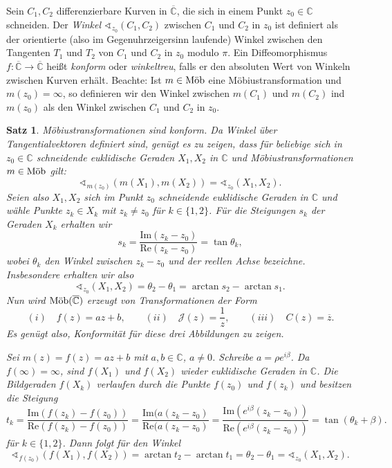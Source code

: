 \documentclass[11pt]{book}
\numberwithin{dummy}{section}
\newtheorem{theorem}{Satz}[section]
\theoremstyle{nonumberbreak}
\newenvironment{pr}[1][]{\ifthenelse{\equal{#1}{}}{\proof}{\proof[#1]}\rm}{\endproof}
\newcommand{\C}{\mathbb{C}}
\newcommand{\CC}{\overline{\mathbb{C}}}
\newcommand{\la}{\longrightarrow}
\newcommand{\amob}{\textup{Möb}}
\begin{document}
\begin{spacing}{1.4}
Sein $C_1, C_2$ differenzierbare Kurven in $\CC$, die sich in einem Punkt $z_0 \in \C$ schneiden. Der \textit{Winkel} $\sphericalangle_{z_0} (C_1, C_2)$ zwischen $C_1$ und $C_2$ in $z_0$ ist definiert als der orientierte (also im Gegenuhrzeigersinn laufende) Winkel zwischen den Tangenten $T_1$ und $T_2$ von $C_1$ und $C_2$ in $z_0$ modulo $\pi$. Ein Diffeomorphismus $f: \CC \la \CC$ heißt \textit{konform} oder \textit{winkeltreu}, falls er den absoluten Wert von Winkeln zwischen Kurven erhält. Beachte: Ist $m \in \amob$ eine Möbiustransformation und $m(z_0) = \infty$, so definieren wir den Winkel zwischen $m(C_1)$ und $m(C_2)$ ind $m(z_0)$ als den Winkel zwischen $C_1$ und $C_2$ in $z_0$.


\hypertarget{satzeinsachteins}{}
\begin{theorem}    %
Möbiustransformationen sind konform.
\begin{pr}
Da Winkel über Tangentialvektoren definiert sind, genügt es zu zeigen, dass für beliebige sich in $z_0 \in \C$ schneidende euklidische Geraden $X_1, X_2$ in $\C$ und Möbiustransformationen $m \in \amob$ gilt:
$$\sphericalangle_{m(z_0)} (m(X_1), m(X_2)) = \sphericalangle_{z_0} (X_1, X_2).$$
Seien also $X_1, X_2$ sich im Punkt $z_0$ schneidende euklidische Geraden in $\C$ und wähle Punkte $z_k \in X_k$ mit $z_k \neq z_0$ für $k \in \{1,2\}$. Für die Steigungen $s_k$ der Geraden $X_k$ erhalten wir 
$$s_k = \frac{ \mathrm{Im}(z_k-z_0)}{\mathrm{Re}(z_k - z_0)} = \tan \theta_k,$$
wobei $\theta_k$ den Winkel zwischen $z_k-z_0$ und der reellen Achse bezeichne. Insbesondere erhalten wir also 
$$\sphericalangle_{z_0}(X_1, X_2) = \theta_2 - \theta_1 = \arctan s_2 - \arctan s_1.$$
Nun wird $\amob(\CC)$ erzeugt von Transformationen der Form 
$$(i) \quad f(z) = az+b, \qquad (ii) \quad \mathcal{J}(z) = \frac{1}{z}, \qquad (iii) \quad C(z) = \overline{z}.$$
Es genügt also, Konformität für diese drei Abbildungen zu zeigen.
\begin{compactenum}
\item Sei $m(z) = f(z) = az+b$ mit $a,b \in \C$, $a \neq 0$. Schreibe $a= \rho e^{i \beta}$. Da $f(\infty) = \infty$, sind $f(X_1)$ und $f(X_2)$ wieder euklidische Geraden in $\C$. Die Bildgeraden $f(X_k)$ verlaufen durch die Punkte $f(z_0)$ und $f(z_k)$ und besitzen die Steigung 
$$t_k = \frac{\mathrm{Im}(f(z_k) - f(z_0))}{\mathrm{Re}(f(z_k)-f(z_0))} = \frac{\mathrm{Im}(a (z_k-z_0)}{\mathrm{Re}(a (z_k-z_0)}  = \frac{\mathrm{Im}(e^{i\beta}(z_k-z_0))}{\mathrm{Re}(e^{i \beta} (z_k-z_0))} = \tan ( \theta_k + \beta).$$
für $k \in \{1,2\}$. Dann folgt für den Winkel
$$\sphericalangle_{f(z_0)} (f(X_1), f(X_2)) = \arctan t_2 - \arctan t_1 = \theta_2 - \theta_1 = \sphericalangle_{z_0} (X_1, X_2).$$


\end{compactenum}
\end{pr}
\end{theorem}
\end{spacing}
\end{document}
